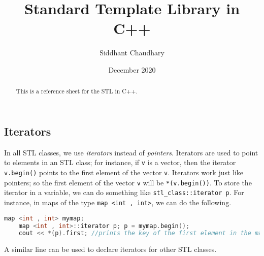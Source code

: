 \documentclass[12pt,a4paper]{amsart}
\numberwithin{equation}{section}
\theoremstyle{definition}
\begin{document}
\title{Standard Template Library in C++}
\author{Siddhant Chaudhary}
\date{December 2020}

\maketitle
    
\begin{abstract}
This is a reference sheet for the STL in C++.
\end{abstract}
    
\tableofcontents

\subsection{Iterators} In all STL classes, we use \textit{iterators} instead of \textit{pointers}. Iterators are used to point to elements in an STL class; for instance, if \verb|v| is a vector, then the iterator \verb|v.begin()| points to the first element of the vector \verb|v|. Iterators work just like pointers; so the first element of the vector \verb|v| will be \verb|*(v.begin())|. To store the iterator in a variable, we can do something like \verb|stl_class::iterator p|. For instance, in maps of the type \verb|map <int , int>|, we can do the following.  
\begin{lstlisting}[language=C++]
    map <int , int> mymap;
    map <int , int>::iterator p; p = mymap.begin();
    cout << *(p).first; //prints the key of the first element in the map
\end{lstlisting}
A similar line can be used to declare iterators for other STL classes.
\end{document}
